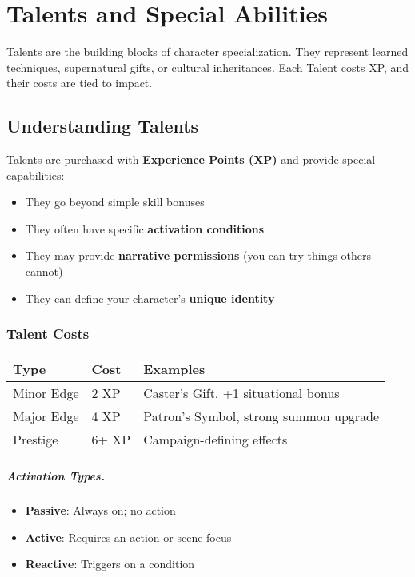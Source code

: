 \chapter{Talents and Special Abilities}
\label{ch:talents}

Talents are the building blocks of character specialization. They represent learned techniques, supernatural gifts, or cultural inheritances. Each Talent costs XP, and their costs are tied to impact.

\section{Understanding Talents}

Talents are purchased with \textbf{Experience Points (XP)} and provide special capabilities:
\begin{itemize}
\item They go beyond simple skill bonuses
\item They often have specific \textbf{activation conditions}
\item They may provide \textbf{narrative permissions} (you can try things others cannot)
\item They can define your character's \textbf{unique identity}
\end{itemize}

\subsection*{Talent Costs}
\begin{center}
\small
\begin{tabular}{lll}
\toprule
\textbf{Type} & \textbf{Cost} & \textbf{Examples} \\
\midrule
Minor Edge & 2 XP & Caster's Gift, +1 situational bonus \\
Major Edge & 4 XP & Patron's Symbol, strong summon upgrade \\
Prestige & 6+ XP & Campaign-defining effects \\
\bottomrule
\end{tabular}
\end{center}

\paragraph{Activation Types.}
\begin{itemize}
\item \textbf{Passive}: Always on; no action
\item \textbf{Active}: Requires an action or scene focus
\item \textbf{Reactive}: Triggers on a condition
\end{itemize}

